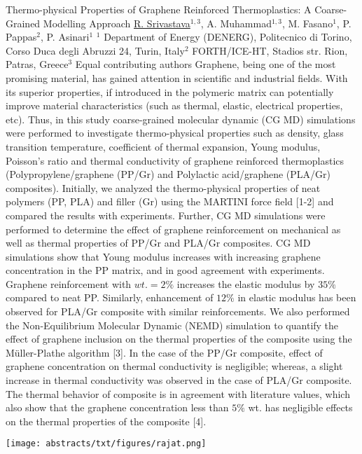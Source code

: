 
    \begin{abstract_online}{Thermo-physical Properties of Graphene Reinforced Thermoplastics: A Coarse- Grained Modelling Approach}{%
        \underline{R. Srivastava}$^{1, 3}$, A. Muhammad$^{1, 3}$, M. Fasano$^{1}$, P. Pappas$^{2}$, P. Asinari$^{1}$}{%
        \IStag}{%
        $^1$ Department of Energy (DENERG), Politecnico di Torino, Corso Duca degli Abruzzi 24, Turin, Italy\newline{}$^2$ FORTH/ICE-HT, Stadios str. Rion, Patras, Greece\newline{}$^3$ Equal contributing authors}
    Graphene, being one of the most promising material, has gained attention in scientific and industrial fields. With its superior properties, if introduced in the polymeric matrix can potentially improve material characteristics (such as thermal, elastic, electrical properties, etc). Thus, in this study coarse-grained molecular dynamic (CG MD) simulations were performed to investigate thermo-physical properties such as density, glass transition temperature, coefficient of thermal expansion, Young modulus, Poisson’s ratio and thermal conductivity of graphene reinforced thermoplastics (Polypropylene/graphene (PP/Gr) and Polylactic acid/graphene (PLA/Gr) composites).  Initially, we analyzed the thermo-physical properties of neat polymers (PP, PLA) and filler (Gr) using the MARTINI force field [1-2] and compared the results with experiments. Further, CG MD simulations were performed to determine the effect of graphene reinforcement on mechanical as well as thermal properties of PP/Gr and PLA/Gr composites. CG MD simulations show that Young modulus increases with increasing graphene concentration in the PP matrix, and in good agreement with experiments. Graphene reinforcement with $wt. = 2 \%$ increases the elastic modulus by $35 \%$ compared to neat PP. Similarly, enhancement of $12 \%$ in elastic modulus has been observed for PLA/Gr composite with similar reinforcements. We also performed the Non-Equilibrium Molecular Dynamic (NEMD) simulation to quantify the effect of graphene inclusion on the thermal properties of the composite using the Müller-Plathe algorithm [3]. In the case of the PP/Gr composite, effect of graphene concentration on thermal conductivity is negligible; whereas, a slight increase in thermal conductivity was observed in the case of PLA/Gr composite. The thermal behavior of composite is in agreement with literature values, which also show that the graphene concentration less than $5 \%$ wt. has negligible effects on the thermal properties of the composite [4].  \begin{center}  \texttt{[image: abstracts/txt/figures/rajat.png]}  \caption{\textbf{Figure 1(a)} Young’s modulus (E) of PP/Gr composite as function of Gr $wt \%$. \textbf{(b)} Young’s modulus (E) of PLA/Gr composite as function of Gr $wt \%$.}  \end{center}  
    

\end{abstract_online}
